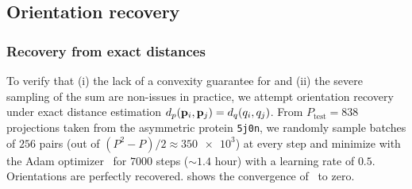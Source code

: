 
\subsection{Orientation recovery}\label{sec:results:orientation-recovery}


\subsubsection{Recovery from exact distances}\label{sec:results:orientation-recovery:exact}


To verify that (i) the lack of a convexity guarantee for  and (ii) the severe sampling of the sum are non-issues in practice, we attempt orientation recovery under exact distance estimation $d_p(\mathbf{p}_i, \mathbf{p}_j) = d_q(q_i, q_j)$.
From $P_{\text{test}}=838$ projections taken from the asymmetric protein \texttt{5j0n}, we randomly sample batches of $256$ pairs (out of $(P^2-P)/2 \approx \num{350e3}$) at every step and minimize  with the Adam optimizer~\cite{kingma2014adam} for $\num{7000}$ steps ($\sim 1.4$ hour) with a learning rate of $0.5$.
Orientations are perfectly recovered.
 shows the convergence of~ to zero.

